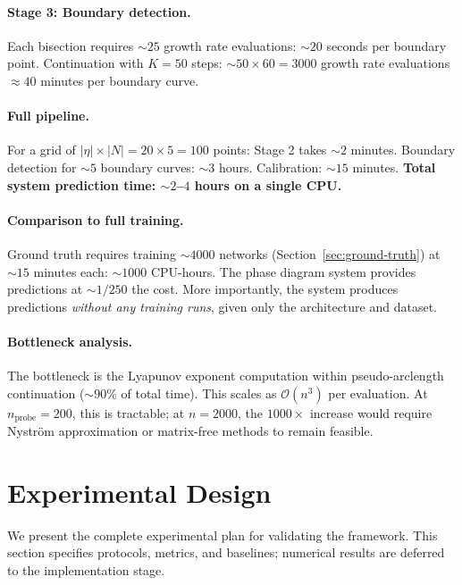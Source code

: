 \documentclass[11pt]{article}
\theoremstyle{definition}
\newcommand{\cO}{\mathcal{O}}
\begin{document}
\paragraph{Stage 3: Boundary detection.} Each bisection requires $\sim 25$ growth rate evaluations: $\sim 20$ seconds per boundary point. Continuation with $K = 50$ steps: $\sim 50 \times 60 = 3000$ growth rate evaluations $\approx 40$ minutes per boundary curve.

\paragraph{Full pipeline.} For a grid of $|\eta| \times |N| = 20 \times 5 = 100$ points: Stage 2 takes $\sim 2$ minutes. Boundary detection for $\sim 5$ boundary curves: $\sim 3$ hours. Calibration: $\sim 15$ minutes. \textbf{Total system prediction time: $\sim 2$--$4$ hours on a single CPU.}

\paragraph{Comparison to full training.} Ground truth requires training $\sim 4000$ networks (Section~\ref{sec:ground-truth}) at $\sim 15$ minutes each: $\sim 1000$ CPU-hours. The phase diagram system provides predictions at $\sim 1/250$ the cost. More importantly, the system produces predictions \emph{without any training runs}, given only the architecture and dataset.

\paragraph{Bottleneck analysis.} The bottleneck is the Lyapunov exponent computation within pseudo-arclength continuation ($\sim 90\%$ of total time). This scales as $\cO(n^3)$ per evaluation. At $n_{\mathrm{probe}} = 200$, this is tractable; at $n = 2000$, the $1000 \times$ increase would require Nystr\"om approximation or matrix-free methods to remain feasible.

\section{Experimental Design}
\label{sec:experiments}

We present the complete experimental plan for validating the framework. This section specifies protocols, metrics, and baselines; numerical results are deferred to the implementation stage.
\end{document}
